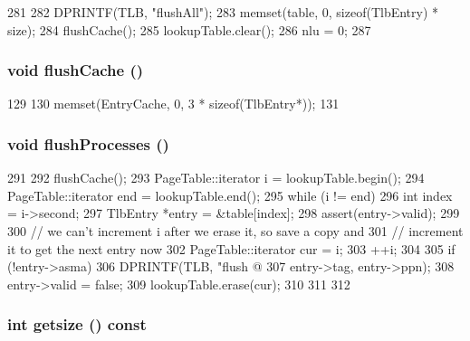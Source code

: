 \begin{DoxyCode}
281 {
282     DPRINTF(TLB, "flushAll\n");
283     memset(table, 0, sizeof(TlbEntry) * size);
284     flushCache();
285     lookupTable.clear();
286     nlu = 0;
287 }
\end{DoxyCode}
\hypertarget{classAlphaISA_1_1TLB_ab93a13c29b6326413ba76bdd7e54ad41}{
\subsubsection[{flushCache}]{\setlength{\rightskip}{0pt plus 5cm}void flushCache ()}}
\label{classAlphaISA_1_1TLB_ab93a13c29b6326413ba76bdd7e54ad41}



\begin{DoxyCode}
129     {
130         memset(EntryCache, 0, 3 * sizeof(TlbEntry*));
131     }
\end{DoxyCode}
\hypertarget{classAlphaISA_1_1TLB_a1d200c761e7041c940eb452220c466d7}{
\subsubsection[{flushProcesses}]{\setlength{\rightskip}{0pt plus 5cm}void flushProcesses ()}}
\label{classAlphaISA_1_1TLB_a1d200c761e7041c940eb452220c466d7}



\begin{DoxyCode}
291 {
292     flushCache();
293     PageTable::iterator i = lookupTable.begin();
294     PageTable::iterator end = lookupTable.end();
295     while (i != end) {
296         int index = i->second;
297         TlbEntry *entry = &table[index];
298         assert(entry->valid);
299 
300         // we can't increment i after we erase it, so save a copy and
301         // increment it to get the next entry now
302         PageTable::iterator cur = i;
303         ++i;
304 
305         if (!entry->asma) {
306             DPRINTF(TLB, "flush @%
307                     entry->tag, entry->ppn);
308             entry->valid = false;
309             lookupTable.erase(cur);
310         }
311     }
312 }
\end{DoxyCode}
\hypertarget{classAlphaISA_1_1TLB_ae121404a6cfcf714e05fe2231ce4c7fc}{
\subsubsection[{getsize}]{\setlength{\rightskip}{0pt plus 5cm}int getsize () const}}
\label{classAlphaISA_1_1TLB_ae121404a6cfcf714e05fe2231ce4c7fc}




